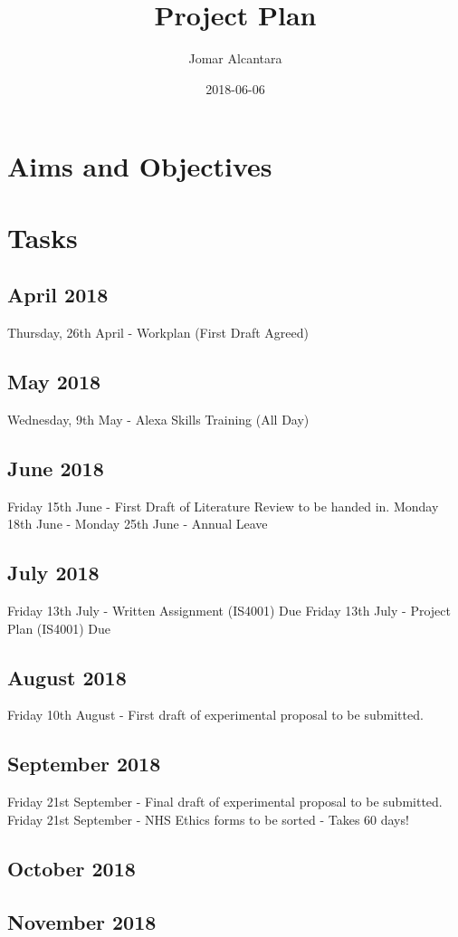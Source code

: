 \documentclass[a4paper]{article}
\title{Project Plan}
\date{2018-06-06}
\author{Jomar Alcantara}
\begin{document}
\section{Aims and Objectives}
\section{Tasks}
	\subsection{April 2018}
	Thursday, 26th April - Workplan (First Draft Agreed)
	\subsection{May 2018}
	Wednesday, 9th May - Alexa Skills Training (All Day)
	\subsection{June 2018}
	Friday 15th June - First Draft of Literature Review to be handed in.
	\newline
	Monday 18th June - Monday 25th June - Annual Leave
	\subsection{July 2018}
	Friday 13th July - Written Assignment (IS4001) Due
	Friday 13th July - Project Plan (IS4001) Due
	
	\subsection{August 2018}
	Friday 10th August - First draft of experimental proposal to be submitted.
	
	
	\subsection{September 2018}
	Friday 21st September - Final draft of experimental proposal to be submitted. 
	Friday 21st September - NHS Ethics forms to be sorted  - Takes 60 days!
	\subsection{October 2018}

	\subsection{November 2018}
	
\end{document}
